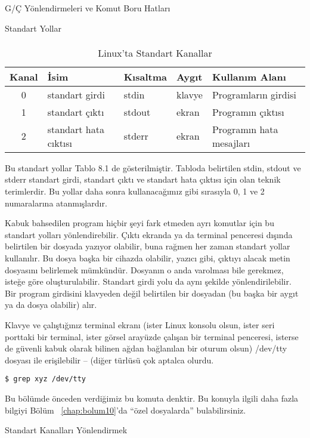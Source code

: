 \begin{section}{G/Ç Yönlendirmeleri ve Komut Boru Hatları}
\begin{subsection}{Standart Yollar}
\paragraph{}{
\begin {table}[H]
\caption {Linux'ta Standart Kanallar} \label{tab:title} 
\begin{tabular}{c l l l l}
\hline
Kanal & İsim & Kısaltma & Aygıt & Kullanım Alanı\\
\hline
0	& standart girdi &		stdin	&	klavye	&   Programların girdisi\\
1	&standart çıktı&      	stdout&		ekran&	   Programın çıktısı\\
2 	&standart hata cıktısı  &       stderr	&	ekran	&   Programın hata mesajları \\
\hline
\end{tabular}
\end {table}
}

Bu standart yollar Tablo 8.1 de gösterilmiştir. Tabloda belirtilen stdin, stdout ve stderr standart girdi, standart çıktı ve standart hata çıktısı için olan teknik terimlerdir. Bu yollar daha sonra kullanacağımız gibi sırasıyla 0, 1 ve 2 numaralarına atanmışlardır.

Kabuk bahsedilen program hiçbir şeyi fark etmeden ayrı komutlar için bu standart yolları yönlendirebilir. Çıktı ekranda ya da terminal penceresi dışında belirtilen bir dosyada yazıyor olabilir, buna rağmen her zaman standart yollar kullanılır. Bu dosya başka bir cihazda olabilir, yazıcı gibi, çıktıyı alacak metin dosyasını belirlemek mümkündür. Dosyanın o anda varolması bile gerekmez, isteğe göre oluşturulabilir. Standart girdi yolu da aynı şekilde yönlendirilebilir. Bir program girdisini klavyeden değil belirtilen bir dosyadan (bu başka bir aygıt ya da dosya olabilir) alır.

Klavye ve çalıştığınız terminal ekranı (ister Linux konsolu olsun, ister seri porttaki bir terminal, ister görsel arayüzde çalışan bir terminal penceresi, isterse de güvenli kabuk olarak bilinen ağdan bağlanılan bir oturum olsun) /dev/tty dosyası ile erişilebilir –  (diğer türlüsü çok aptalca olurdu.
\begin{verbatim}
$ grep xyz /dev/tty 
\end{verbatim}

Bu bölümde önceden verdiğimiz bu komuta denktir. Bu konuyla ilgili daha fazla bilgiyi Bölüm ~\ref{chap:bolum10}'da “özel dosyalarda” bulabilirsiniz.
\end{subsection}
\begin{subsection}{Standart Kanalları Yönlendirmek}


\end{subsection}
\end{section}
